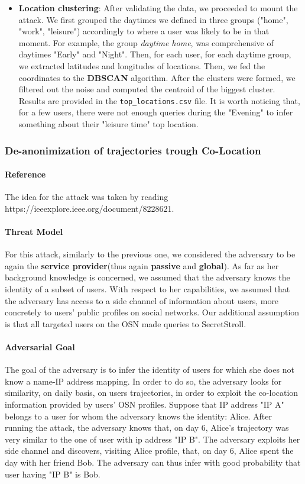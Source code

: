 \documentclass[10pt,conference,compsocconf]{IEEEtran}
\begin{document}
\begin{itemize}
    \item \textbf{Location clustering}: After validating the data, we proceeded
    to mount the attack. We first grouped the daytimes we defined in three groups ("home", "work", "leisure") accordingly to where a user was likely to be in that moment. For example, the group \textit{daytime home},
    was comprehensive of daytimes "Early" and "Night". Then, for
    each user, for each daytime group, we
    extracted latitudes and longitudes of locations. Then, we fed the
    coordinates to the \textbf{DBSCAN} algorithm. After
    the clusters were formed, we filtered out the noise and computed
    the centroid of the biggest cluster. Results are provided in the \texttt{top\_locations.csv} file. It is
    worth noticing that, for a few users, there were not enough queries during
    the "Evening" to infer something about their "leisure time" top location.
\end{itemize}

\subsubsection{De-anonimization of trajectories trough Co-Location}

\paragraph{Reference}
The idea for the attack was taken by reading https://ieeexplore.ieee.org/document/8228621.
\paragraph{Threat Model}
For this attack, similarly to the previous one, we considered the adversary to
be again the \textbf{service provider}(thus again
\textbf{passive} and \textbf{global}).
As far as her background knowledge is concerned, we assumed that the adversary
knows the identity of a subset of users. With respect to her capabilities, we assumed that
the adversary has access to a side channel of information about users, more
concretely to users' public profiles on social networks. Our additional assumption is that all targeted users on the OSN made queries to SecretStroll.

\paragraph{Adversarial Goal}
The goal of the adversary is to infer the identity of users for which she does
not know a name-IP address mapping. In order to do so, the adversary looks for
similarity, on daily basis, on users trajectories, in order to exploit the
co-location information provided by users' OSN profiles. Suppose that IP address "IP A" belongs to a user for
whom the adversary knows the identity: Alice. After running the attack, the
adversary knows that, on day 6, Alice's trajectory was very similar to the one
of user with ip address "IP B". The adversary exploits her side channel
and discovers, visiting Alice profile, that, on day 6, Alice spent the
day with her friend Bob. The adversary can thus infer with good probability that
user having "IP B" is Bob.
\end{document}
